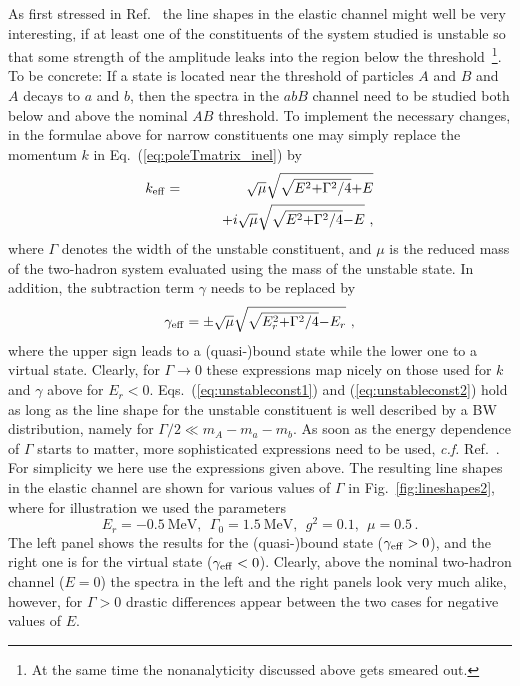 As first stressed in Ref.~\cite{Braaten:2007dw} the line shapes in the elastic
channel might well be very interesting, if at least one of the constituents of
the system studied is unstable so that some strength of the amplitude leaks into
the region below the threshold~\footnote{At the same time the nonanalyticity
discussed above gets smeared out.}. To be concrete: If a state is located near
the threshold of particles  $A$ and $B$ and $A$ decays to $a$ and $b$, then  the
spectra in the  $abB$ channel need to be studied both below and above the
nominal $AB$ threshold.
To implement the necessary changes, in the formulae above for narrow
constituents one may simply replace the momentum $k$ in 
Eq.~(\ref{eq:poleTmatrix_inel}) by~\cite{Braaten:2007dw} 
\begin{eqnarray}\nonumber k_{\rm eff} &=&
\sqrt{\mu}\sqrt{\sqrt{E^2{+}\Gamma^2/4}{+}E} \\
& & \qquad + i\sqrt{\mu}\sqrt{\sqrt{E^2{+}\Gamma^2/4}{-}E}\ ,
\label{eq:unstableconst1}
\end{eqnarray}
where $\Gamma$ denotes the width of the unstable constituent, and $\mu$ is the
reduced mass of the two-hadron system evaluated using the mass of the unstable 
state. In addition, the subtraction term $\gamma$ needs to be replaced by
\begin{eqnarray}
\gamma_{\rm eff} = \pm\sqrt{\mu}\sqrt{\sqrt{E_r^2{+}\Gamma^2/4}{-}E_r} \ ,
\label{eq:unstableconst2}
\end{eqnarray}
where the upper sign leads to a (quasi-)bound state while the lower one to a
virtual state.
Clearly, for $\Gamma\to 0$ these expressions map nicely on those used for $k$
and $\gamma$ above for $E_r<0$.
Eqs.~(\ref{eq:unstableconst1}) and (\ref{eq:unstableconst2}) hold as long as the line shape for the unstable
constituent is well described by a BW distribution, namely for
$\Gamma/2\ll m_A-m_a-m_b$.
As soon as the energy dependence of $\Gamma$ starts to matter, more
sophisticated expressions need to be used, {\sl c.f.}
Ref.~\cite{Hanhart:2010wh}.
For simplicity we here use the expressions given above.
 The resulting line shapes in the elastic channel are shown for various values
of $\Gamma$ in Fig.~\ref{fig:lineshapes2},
where for illustration we used the parameters
 \begin{equation}
 E_r = -0.5 \ \mbox{MeV}, ~~ \Gamma_0= 1.5 \ \mbox{MeV},~~ g^2=0.1,~~ \mu =
 0.5\, .
 \label{eq:para} 
 \end{equation}
 The left panel shows the results for the (quasi-)bound state ($\gamma_{\rm
 eff}>0$), and the right one is for the virtual state ($\gamma_{\rm eff}<0$).
 Clearly, above the nominal two-hadron channel ($E=0$) the  spectra in the left
 and the right panels look very much alike, however, for $\Gamma>0$ drastic
 differences appear between the two cases for negative values of $E$.

